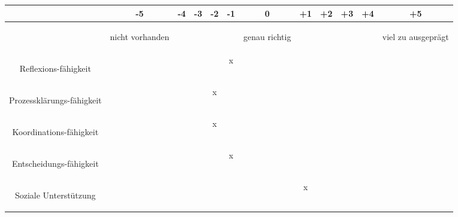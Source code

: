 \begin{tabular}{C{\fabstand}|C{\abstand}|C{\abstand}|C{\abstand}|C{\abstand}|C{\abstand}|C{\abstand}|C{\abstand}|C{\abstand}|C{\abstand}|C{\abstand}|C{\abstand}|}
\hline
& -5 & -4 & -3 & -2 & -1 & 0 & +1 & +2 & +3 & +4 & +5\\
\hline
&\begin{tiny}nicht vorhanden \end{tiny}& & & & & \begin{tiny}genau richtig \end{tiny}& & & & & \begin{tiny}viel zu ausgeprägt\end{tiny}\\
\hline
\begin{tiny} Reflexions-fähigkeit \end{tiny} & & & & & x & & & & & & \\
\hline
\begin{tiny} Prozessklärungs-fähigkeit \end{tiny}& & & & x & & & & & & & \\
\hline
\begin{tiny} Koordinations-fähigkeit \end{tiny}& & & & x & & & & & & & \\
\hline
\begin{tiny} Entscheidungs-fähigkeit \end{tiny}& & & & & x & & & & & & \\
\hline
\begin{tiny} Soziale Unterstützung \end{tiny}& & & & & & & x & & & & \\
\hline
\end{tabular}

